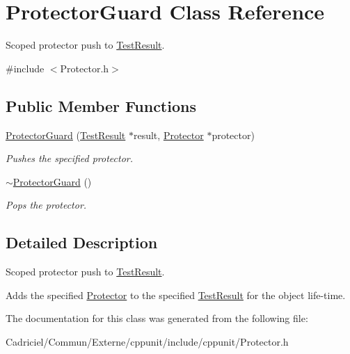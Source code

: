 \hypertarget{class_protector_guard}{\section{Protector\-Guard Class Reference}
\label{class_protector_guard}
}


Scoped protector push to \hyperlink{class_test_result}{Test\-Result}.  




{\ttfamily \#include $<$Protector.\-h$>$}

\subsection*{Public Member Functions}
\begin{DoxyCompactItemize}
\item 
\hypertarget{class_protector_guard_abc4a3b2b51b6d93fb3dd9fed1bbc85db}{\hyperlink{class_protector_guard_abc4a3b2b51b6d93fb3dd9fed1bbc85db}{Protector\-Guard} (\hyperlink{class_test_result}{Test\-Result} $\ast$result, \hyperlink{class_protector}{Protector} $\ast$protector)}\label{class_protector_guard_abc4a3b2b51b6d93fb3dd9fed1bbc85db}

\begin{DoxyCompactList}\small\item\em Pushes the specified protector. \end{DoxyCompactList}\item 
\hypertarget{class_protector_guard_af80b574cc5999746e77ec13d2d0093f5}{\hyperlink{class_protector_guard_af80b574cc5999746e77ec13d2d0093f5}{$\sim$\-Protector\-Guard} ()}\label{class_protector_guard_af80b574cc5999746e77ec13d2d0093f5}

\begin{DoxyCompactList}\small\item\em Pops the protector. \end{DoxyCompactList}\end{DoxyCompactItemize}


\subsection{Detailed Description}
Scoped protector push to \hyperlink{class_test_result}{Test\-Result}. 

Adds the specified \hyperlink{class_protector}{Protector} to the specified \hyperlink{class_test_result}{Test\-Result} for the object life-\/time. 

The documentation for this class was generated from the following file\-:\begin{DoxyCompactItemize}
\item 
Cadriciel/\-Commun/\-Externe/cppunit/include/cppunit/Protector.\-h\end{DoxyCompactItemize}
